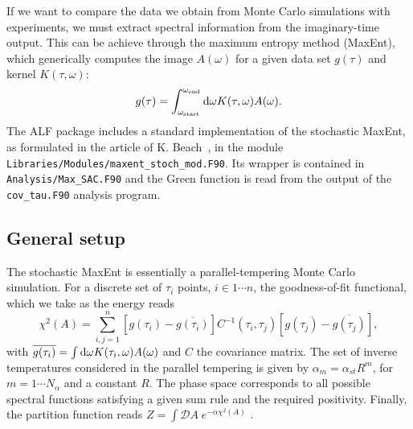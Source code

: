 

If we want to compare the data we obtain from Monte Carlo simulations with experiments, we must extract spectral information from the imaginary-time output. This can be achieve through the maximum entropy method (MaxEnt), which generically computes the  image  $A(\omega) $ for a given  data  set $g(\tau) $  and kernel $K(\tau,\omega) $:
\begin{equation}
g(\tau) =  \int_{\omega_\mathrm{start}}^{\omega_\mathrm{end}} \mathrm{d}{\omega} K(\tau,\omega) A(\omega).
\end{equation} 
The  ALF package includes a standard implementation of the stochastic MaxEnt, as formulated in the article of K. Beach~\cite{Beach04a}, in the module \texttt{Libraries/Modules/\allowbreak{}maxent\_stoch\_mod.F90}. Its wrapper is contained in \texttt{Analysis/Max\_SAC.F90} and the Green function is read from the
output of the \texttt{cov\_tau.F90} analysis program.

\subsection{General setup}

The stochastic MaxEnt is essentially a parallel-tempering Monte Carlo simulation.  For a discrete set of $\tau_i$ points,  $i \in 1 \cdots n $, the goodness-of-fit functional, which we take as the energy reads
\begin{equation}
  \chi^{2}(A) =  \sum_{i,j=1}^{n}   \left[ g(\tau_i)  -  \overline{g(\tau_i)} \right] C^{-1}(\tau_i,\tau_j) \left[    g(\tau_j)  -  \overline{g(\tau_j)} \right] ,
\end{equation}
with $ \overline{g(\tau_i)} =\int \mathrm{d}{\omega} K(\tau_{i},\omega)  A(\omega)$ and  $C$ the covariance matrix. 
The set of inverse temperatures considered in the parallel tempering is given by
$ \alpha_m = \alpha_{st}  R^{m}$, for $m = 1 \cdots N_{\alpha} $ and a constant $R$. The phase space corresponds to all possible spectral functions satisfying a given sum rule and the required positivity.  Finally, the partition function reads
$Z =  \int\mathcal{D}\!A\; e^{-\alpha \chi^{2}(A)}$ \cite{Beach04a}.

